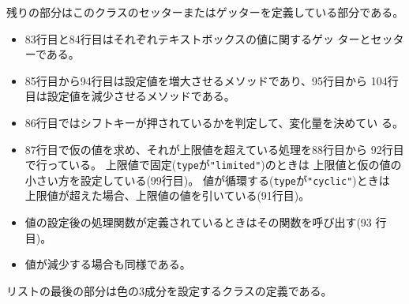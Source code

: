 残りの部分はこのクラスのセッターまたはゲッターを定義している部分である。
\begin{itemize}
 \item 83行目と84行目はそれぞれテキストボックスの値に関するゲッ
       ターとセッターである。
 \item 85行目から94行目は設定値を増大させるメソッドであり、95行目から
       104行目は設定値を減少させるメソッドである。
 \item 86行目ではシフトキーが押されているかを判定して、変化量を決めてい
       る。
 \item 87行目で仮の値を求め、それが上限値を超えている処理を88行目から
			 92行目で行っている。
			 上限値で固定(\texttt{type}が\texttt{"limited"})のときは
       上限値と仮の値の小さい方を設定している(99行目)。
			値が循環する(\texttt{type}が\texttt{"cyclic"})ときは
       上限値が超えた場合、上限値の値を引いている(91行目)。
 \item 値の設定後の処理関数が定義されているときはその関数を呼び出す(93
       行目)。
 \item 値が減少する場合も同様である。
\end{itemize}
リストの最後の部分は色の3成分を設定するクラスの定義である。
